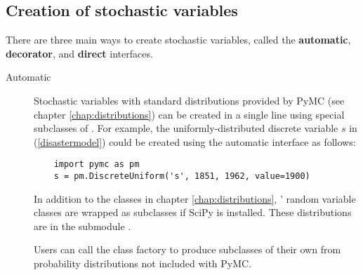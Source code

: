 \subsection{Creation of stochastic variables}
There are three main ways to create stochastic variables, called the \textbf{automatic}, \textbf{decorator}, and \textbf{direct} interfaces.

\begin{description}
    \item[Automatic] Stochastic variables with standard distributions provided by PyMC (see chapter \ref{chap:distributions}) can be created in a single line using special subclasses of . For example, the uniformly-distributed discrete variable $s$ in (\ref{disastermodel}) could be created using the automatic interface as follows:
\begin{verbatim}
    import pymc as pm
    s = pm.DiscreteUniform('s', 1851, 1962, value=1900)
\end{verbatim}

    In addition to the classes in chapter \ref{chap:distributions}, ' random variable classes are wrapped as  subclasses if SciPy is installed. These distributions are in the submodule .

    Users can call the class factory  to produce  subclasses of their own from probability distributions not included with PyMC.%



\end{description}
